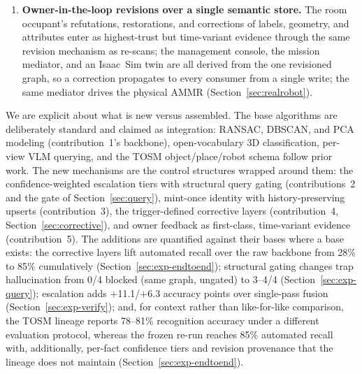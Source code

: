 \documentclass[electronics,article,accept,pdftex,moreauthors]{Definitions/mdpi}
\begin{document}
\begin{enumerate}
from a discard decision into an automatic re-splitting trigger (wall-band
stripping, support-plane and panel-bank cuts), and a structure-condition
ensemble re-detects under varied wall/ceiling removal, recovering
wall-flush objects any single condition amputates while exposing label
instability as a per-object attribute.
\item \textbf{Owner-in-the-loop revisions over a single semantic store.}
The room occupant's refutations, restorations, and corrections of labels,
geometry, and attributes enter as highest-trust but time-variant evidence
through the same revision mechanism as re-scans; the management console,
the mission mediator, and an Isaac~Sim twin are all derived from the one
revisioned graph, so a correction propagates to every consumer from a
single write; the same mediator drives the physical AMMR
(Section~\ref{sec:realrobot}).
\end{enumerate}

We are explicit about what is new versus assembled. The base algorithms
are deliberately standard and claimed as integration: RANSAC, DBSCAN, and
PCA modeling (contribution~1's backbone), open-vocabulary 3D
classification, per-view VLM querying, and the TOSM
object/place/robot schema follow prior work. The new mechanisms are the
control structures wrapped around them: the confidence-weighted
escalation tiers with structural query gating (contributions~2 and the
gate of Section~\ref{sec:query}), mint-once identity with history-preserving
upserts (contribution~3), the trigger-defined corrective layers
(contribution~4, Section~\ref{sec:corrective}), and owner feedback as
first-class, time-variant evidence (contribution~5). The additions are
quantified against their bases where a base exists: the corrective layers
lift automated recall over the raw backbone from 28\% to 85\%
cumulatively (Section~\ref{sec:exp-endtoend}); structural gating changes
trap hallucination from 0/4 blocked (same graph, ungated) to 3--4/4
(Section~\ref{sec:exp-query}); escalation adds $+$11.1/$+$6.3 accuracy
points over single-pass fusion (Section~\ref{sec:exp-verify}); and, for context
rather than like-for-like comparison, the TOSM lineage reports 78--81\%
recognition accuracy under a different evaluation protocol, whereas the
frozen re-run reaches 85\% automated recall with, additionally, per-fact
confidence tiers and revision provenance that the lineage does not
maintain (Section~\ref{sec:exp-endtoend}).
\end{document}
